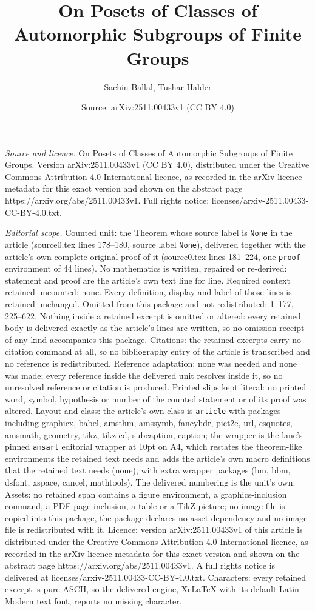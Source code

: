 \documentclass[10pt,a4paper]{amsart}
\title[On Posets of Classes of Automorphic Subgroups of Finite Grou]{On Posets of Classes of Automorphic Subgroups of Finite Groups}
\author{Sachin Ballal, Tushar Halder}
\date{Source: arXiv:2511.00433v1 (CC BY 4.0)}
\begin{document}
\maketitle

\noindent\emph{Source and licence.} On Posets of Classes of Automorphic Subgroups of Finite Groups. Version arXiv:2511.00433v1 (CC BY 4.0), distributed under the Creative Commons Attribution 4.0 International licence, as recorded in the arXiv licence metadata for this exact version and shown on the abstract page https://arxiv.org/abs/2511.00433v1. Full rights notice: licenses/arxiv-2511.00433-CC-BY-4.0.txt.\par\smallskip

\noindent\textit{Editorial scope.} Counted unit: the Theorem whose source label is \texttt{None} in the article (source0.tex lines 178--180, source label \texttt{None}), delivered together with the article's own complete original proof of it (source0.tex lines 181--224, one \texttt{proof} environment of 44 lines). No mathematics is written, repaired or re-derived: statement and proof are the article's own text line for line. Required context retained uncounted: none. Every definition, display and label of those lines is retained unchanged. Omitted from this package and not redistributed: 1--177, 225--622. Nothing inside a retained excerpt is omitted or altered: every retained body is delivered exactly as the article's lines are written, so no omission receipt of any kind accompanies this package. Citations: the retained excerpts carry no citation command at all, so no bibliography entry of the article is transcribed and no reference is redistributed. Reference adaptation: none was needed and none was made; every reference inside the delivered unit resolves inside it, so no unresolved reference or citation is produced. Printed slips kept literal: no printed word, symbol, hypothesis or number of the counted statement or of its proof was altered. Layout and class: the article's own class is \texttt{article} with packages including graphicx, babel, amsthm, amssymb, fancyhdr, pict2e, url, csquotes, amsmath, geometry, tikz, tikz-cd, subcaption, caption; the wrapper is the lane's pinned \texttt{amsart} editorial wrapper at 10pt on A4, which restates the theorem-like environments the retained text needs and adds the article's own macro definitions that the retained text needs (none), with extra wrapper packages (bm, bbm, dsfont, xspace, cancel, mathtools). The delivered numbering is the unit's own. Assets: no retained span contains a figure environment, a graphics-inclusion command, a PDF-page inclusion, a table or a TikZ picture; no image file is copied into this package, the package declares no asset dependency and no image file is redistributed with it. Licence: version arXiv:2511.00433v1 of this article is distributed under the Creative Commons Attribution 4.0 International licence, as recorded in the arXiv licence metadata for this exact version and shown on the abstract page https://arxiv.org/abs/2511.00433v1. A full rights notice is delivered at licenses/arxiv-2511.00433-CC-BY-4.0.txt. Characters: every retained excerpt is pure ASCII, so the delivered engine, XeLaTeX with its default Latin Modern text font, reports no missing character.
\end{document}
